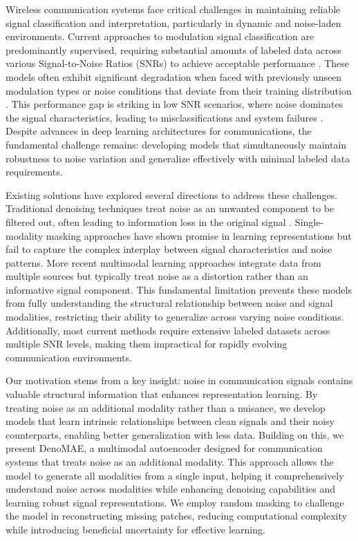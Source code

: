 Wireless communication systems face critical challenges in maintaining reliable signal classification and interpretation, particularly in dynamic and noise-laden environments. Current approaches to modulation signal classification are predominantly supervised, requiring substantial amounts of labeled data across various Signal-to-Noise Ratios (SNRs) to achieve acceptable performance \cite{zheng2024deep}. These models often exhibit significant degradation when faced with previously unseen modulation types or noise conditions that deviate from their training distribution \cite{9965389}. This performance gap is striking in low SNR scenarios, where noise dominates the signal characteristics, leading to misclassifications and system failures \cite{perenda2021learning}. Despite advances in deep learning architectures for communications, the fundamental challenge remains: developing models that simultaneously maintain robustness to noise variation and generalize effectively with minimal labeled data requirements.

Existing solutions have explored several directions to address these challenges. Traditional denoising techniques treat noise as an unwanted component to be filtered out, often leading to information loss in the original signal \cite{shi2023gaf}. Single-modality masking approaches have shown promise in learning representations but fail to capture the complex interplay between signal characteristics and noise patterns. More recent multimodal learning approaches \cite{bachmann2022multimae, bachmann20244m} integrate data from multiple sources but typically treat noise as a distortion rather than an informative signal component. This fundamental limitation prevents these models from fully understanding the structural relationship between noise and signal modalities, restricting their ability to generalize across varying noise conditions. Additionally, most current methods require extensive labeled datasets across multiple SNR levels, making them impractical for rapidly evolving communication environments.

Our motivation stems from a key insight: noise in communication signals contains valuable structural information that enhances representation learning. By treating noise as an additional modality rather than a nuisance, we develop models that learn intrinsic relationships between clean signals and their noisy counterparts, enabling better generalization with less data. Building on this, we present DenoMAE, a multimodal autoencoder designed for communication systems that treats noise as an additional modality. This approach allows the model to generate all modalities from a single input, helping it comprehensively understand noise across modalities while enhancing denoising capabilities and learning robust signal representations. We employ random masking to challenge the model in reconstructing missing patches, reducing computational complexity while introducing beneficial uncertainty for effective learning.

